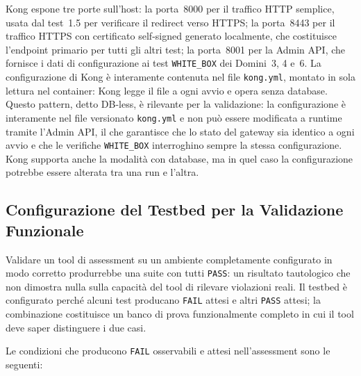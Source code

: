 



Kong espone tre porte sull'host: la porta~8000 per il traffico \gls{HTTP} semplice, usata dal test~1.5 per verificare il redirect verso \gls{HTTPS}; la porta~8443 per il traffico \gls{HTTPS} con certificato self-signed generato localmente, che costituisce l'endpoint primario per tutti gli altri test; la porta~8001 per la Admin \gls{API}, che fornisce i dati di configurazione ai test \texttt{WHITE\_BOX} dei Domini~3, 4 e~6. La configurazione di Kong è interamente contenuta nel file \texttt{kong.yml}, montato in sola lettura nel container: Kong legge il file a ogni avvio e opera senza database. Questo pattern, detto DB-less, è rilevante per la validazione: la configurazione è interamente nel file versionato \texttt{kong.yml} e non può essere modificata a runtime tramite l'Admin \gls{API}, il che garantisce che lo stato del gateway sia identico a ogni avvio e che le verifiche \texttt{WHITE\_BOX} interroghino sempre la stessa configurazione. Kong supporta anche la modalità con database, ma in quel caso la configurazione potrebbe essere alterata tra una run e l'altra.


\subsection{Configurazione del Testbed per la Validazione Funzionale}\label{subsec:configurazione-testbed}

Validare un tool di assessment su un ambiente completamente configurato in modo corretto produrrebbe una suite con tutti \texttt{PASS}: un risultato tautologico che non dimostra nulla sulla capacità del tool di rilevare violazioni reali. Il testbed è configurato perché alcuni test producano \texttt{FAIL} attesi e altri \texttt{PASS} attesi; la combinazione costituisce un banco di prova funzionalmente completo in cui il tool deve saper distinguere i due casi.

Le condizioni che producono \texttt{FAIL} osservabili e attesi nell'assessment sono le seguenti:

